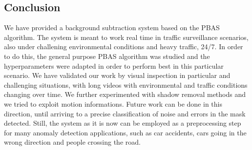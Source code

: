 \subsection*{Conclusion}
We have provided a background subtraction system based on the PBAS algorithm. The system is meant to work real time in traffic surveillance scenarios, also under challening environmental conditions and heavy traffic, 24/7. In order to do this, the general purpose PBAS algorithm was studied and the hyperparameters were adapted in order to perform best in this particular scenario. We have validated our work by visual inspection in particular and challenging situations, with long videos with environmental and traffic conditions changing over time. We further experimented with shadow removal methods and we tried to exploit motion informations. Future work can be done in this direction, until arriving to a precise classification of noise and errors in the mask detected. Still, the system as it is now can be employed as a preprocessing step for many anomaly detection applications, such as car accidents, cars going in the wrong direction and people crossing the road.